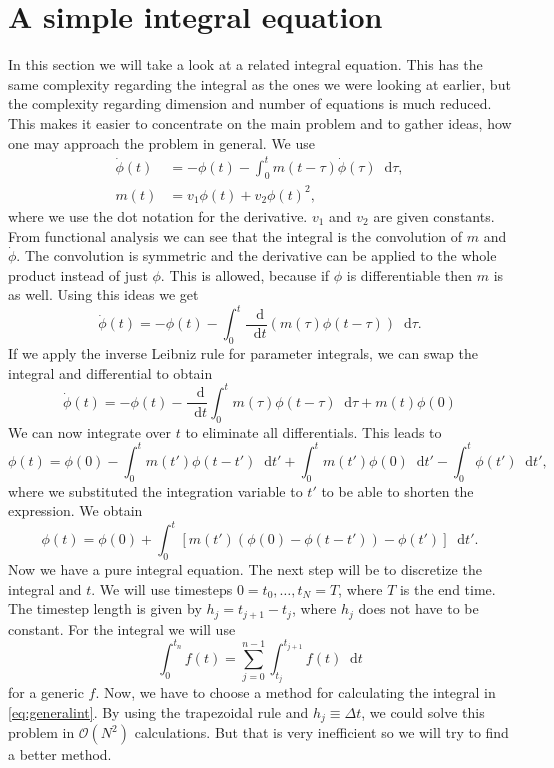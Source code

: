 \documentclass[12pt,a4paper,twoside, open=right]{scrreprt}
\theoremstyle{definition}
\theoremstyle{plain}
\newcommand{\D}{\mathop{}\!\mathrm{d}}
\begin{document}
\section{A simple integral equation}
In this section we will take a look at a related integral equation. This has the same complexity regarding the integral as the ones we were looking at earlier, but the complexity regarding dimension and number of equations is much reduced. This makes it easier to concentrate on the main problem and to gather ideas, how one may approach the problem in general. We use 
\begin{align}
   \dot\phi(t)&=-\phi(t)-\int_0^tm(t-\tau)\dot\phi(\tau)\D\tau,\\
   m(t)&=v_1\phi(t)+v_2\phi(t)^2,
\end{align}
where we use the dot notation for the derivative. $v_1$ and $v_2$ are given constants.
From functional analysis we can see that the integral is the convolution of $m$ and $\dot\phi$. The convolution is symmetric and the derivative can be applied to the whole product instead of just $\phi$. This is allowed, because if $\phi$ is differentiable then $m$ is as well. Using this ideas we get
\begin{equation}
    \dot\phi(t)=-\phi(t)-\int_0^t\frac{\D}{\D t}(m(\tau)\phi(t-\tau))\D\tau.
\end{equation}
If we apply the inverse Leibniz rule for parameter integrals, we can swap the integral and differential to obtain
\begin{equation}
    \dot\phi(t)=-\phi(t) -\frac{\D}{\D t}\int_0^t m(\tau)\phi(t-\tau)\D\tau +m(t)\phi(0)
\end{equation}
We can now integrate over $t$ to eliminate all differentials. This leads to 
\begin{equation}
    \phi(t)=\phi(0)-\int_0^tm(t')\phi(t-t')\D t' +\int_0^tm(t')\phi(0)\D t' -\int_0^t\phi(t')\D t',
\end{equation}
where we substituted the integration variable to $t'$ to be able to shorten the expression. We obtain
\begin{equation}
    \phi(t)=\phi(0)+\int_0^t[m(t')(\phi(0)-\phi(t-t'))-\phi(t')]\D t'.\label{eq:phianalytic}
\end{equation}
Now we have a pure integral equation. The next step will be to discretize the integral and $t$.
We will use timesteps $0=t_0,\dotsc,t_N=T$, where $T$ is the end time. The timestep length is given by $h_j=t_{j+1}-t_j$, where $h_j$ does not have to be constant. For the integral we will use 
\begin{equation}
    \int_0^{t_n}f(t)=\sum_{j=0}^{n-1}\int_{t_j}^{t_{j+1}}f(t)\D t\label{eq:generalint}
\end{equation}
for a generic $f$. Now, we have to choose a method for calculating the integral in \eqref{eq:generalint}. By using the trapezoidal rule and $h_j\equiv \Delta t$, we could solve this problem in $\mathcal{O}(N^2)$ calculations. But that is very inefficient so we will try to find a better method.
\end{document}
